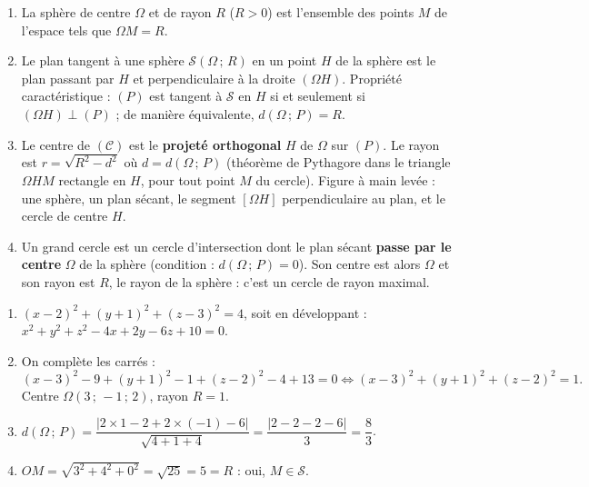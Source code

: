 \documentclass[11pt]{article}
\newcommand{\cle}[1]{{\popxbold\color{popdark}#1}}
\begin{document}
\begin{corrige}
\begin{enumerate}
\item La \cle{sphère} de centre $\Omega$ et de rayon $R$ ($R>0$) est l'ensemble des points $M$ de l'espace tels que $\Omega M=R$.
\item Le \cle{plan tangent} à une sphère $\mathcal{S}(\Omega\,;\,R)$ en un point $H$ de la sphère est le plan passant par $H$ et perpendiculaire à la droite $(\Omega H)$. Propriété caractéristique : $(P)$ est tangent à $\mathcal{S}$ en $H$ si et seulement si $(\Omega H)\perp(P)$ ; de manière équivalente, $d(\Omega\,;\,P)=R$.
\item Le centre de $(\mathcal{C})$ est le \textbf{projeté orthogonal} $H$ de $\Omega$ sur $(P)$. Le rayon est $r=\sqrt{R^2-d^2}$ où $d=d(\Omega\,;\,P)$ (théorème de Pythagore dans le triangle $\Omega HM$ rectangle en $H$, pour tout point $M$ du cercle). Figure à main levée : une sphère, un plan sécant, le segment $[\Omega H]$ perpendiculaire au plan, et le cercle de centre $H$.
\item Un \cle{grand cercle} est un cercle d'intersection dont le plan sécant \textbf{passe par le centre} $\Omega$ de la sphère (condition : $d(\Omega\,;\,P)=0$). Son centre est alors $\Omega$ et son rayon est $R$, le rayon de la sphère : c'est un cercle de rayon maximal.
\end{enumerate}
\end{corrige}

\begin{corrige}
\begin{enumerate}
\item $(x-2)^2+(y+1)^2+(z-3)^2=4$, soit en développant : $x^2+y^2+z^2-4x+2y-6z+10=0$.
\item On complète les carrés :
\[(x-3)^2-9+(y+1)^2-1+(z-2)^2-4+13=0 \iff (x-3)^2+(y+1)^2+(z-2)^2=1.\]
Centre $\Omega(3\,;\,-1\,;\,2)$, rayon $R=1$.
\item $d(\Omega\,;\,P)=\dfrac{|2\times 1-2+2\times(-1)-6|}{\sqrt{4+1+4}}=\dfrac{|2-2-2-6|}{3}=\dfrac{8}{3}$.
\item $OM=\sqrt{3^2+4^2+0^2}=\sqrt{25}=5=R$ : oui, $M\in\mathcal{S}$.
\end{enumerate}
\end{corrige}
\end{document}
